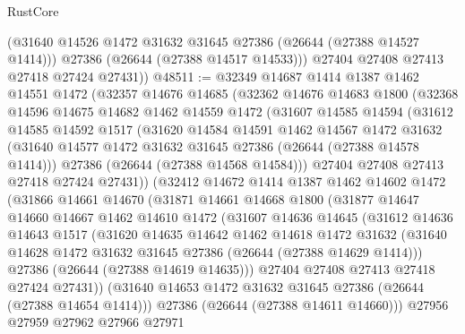 \begin{lexlean}{RustCore}
\begin{coremodule}
          (@31640 @14526 @1472 @31632 @31645 @27386 (@26644 (@27388 @14527 @1414)))
          @27386
          (@26644 (@27388 @14517 @14533)))
        @27404
        @27408
        @27413
        @27418
        @27424
        @27431))
@48511 := @32349
    @14687
    @1414
    @1387
    @1462
    @14551
    @1472
    (@32357
      @14676
      @14685
      (@32362
        @14676
        @14683
        @1800
        (@32368
          @14596
          @14675
          @14682
          @1462
          @14559
          @1472
          (@31607
            @14585
            @14594
            (@31612
              @14585
              @14592
              @1517
              (@31620
                @14584
                @14591
                @1462
                @14567
                @1472
                @31632
                (@31640 @14577 @1472 @31632 @31645 @27386 (@26644 (@27388 @14578 @1414)))
                @27386
                (@26644 (@27388 @14568 @14584)))
              @27404
              @27408
              @27413
              @27418
              @27424
              @27431))
          (@32412
            @14672
            @1414
            @1387
            @1462
            @14602
            @1472
            (@31866
              @14661
              @14670
              (@31871
                @14661
                @14668
                @1800
                (@31877
                  @14647
                  @14660
                  @14667
                  @1462
                  @14610
                  @1472
                  (@31607
                    @14636
                    @14645
                    (@31612
                      @14636
                      @14643
                      @1517
                      (@31620
                        @14635
                        @14642
                        @1462
                        @14618
                        @1472
                        @31632
                        (@31640 @14628 @1472 @31632 @31645 @27386 (@26644 (@27388 @14629 @1414)))
                        @27386
                        (@26644 (@27388 @14619 @14635)))
                      @27404
                      @27408
                      @27413
                      @27418
                      @27424
                      @27431))
                  (@31640 @14653 @1472 @31632 @31645 @27386 (@26644 (@27388 @14654 @1414)))
                  @27386
                  (@26644 (@27388 @14611 @14660)))
                @27956
                @27959
                @27962
                @27966
                @27971

\end{coremodule}
\end{lexlean}
